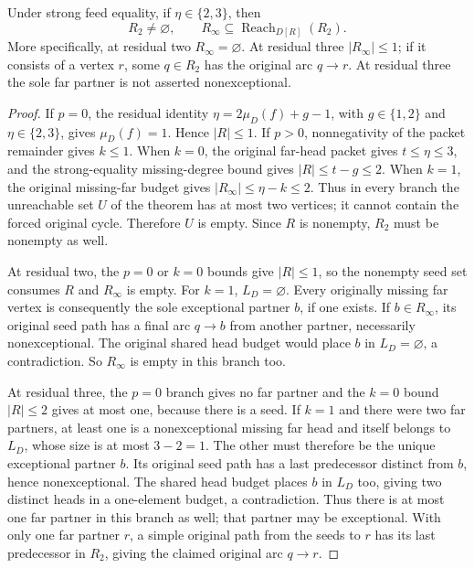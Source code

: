 \begin{corollary}
\label{cor:weak-equality-low-residual-seed}
Under strong feed equality, if $\eta\in\{2,3\}$, then
\[
 R_2\ne\varnothing,
 \qquad R_\infty\subseteq\operatorname{Reach}_{D[R]}(R_2).
\]
More specifically, at residual two $R_\infty=\varnothing$.
At residual three $|R_\infty|\le1$; if it consists of a vertex $r$,
some $q\in R_2$ has the original arc $q\to r$.
At residual three the sole far partner is not asserted nonexceptional.
\end{corollary}
\begin{proof}
If $p=0$, the residual identity
$\eta=2\mu_D(f)+g-1$, with $g\in\{1,2\}$ and
$\eta\in\{2,3\}$, gives $\mu_D(f)=1$. Hence $|R|\le1$.
If $p>0$, nonnegativity of the packet remainder gives $k\le1$.
When $k=0$, the original far-head packet gives $t\le\eta\le3$,
and the strong-equality missing-degree bound gives
$|R|\le t-g\le2$. When $k=1$, the original missing-far budget gives
$|R_\infty|\le\eta-k\le2$. Thus in every branch the unreachable
set $U$ of the theorem has at most two vertices; it cannot contain
the forced original cycle. Therefore $U$ is empty. Since $R$ is
nonempty, $R_2$ must be nonempty as well.

At residual two, the $p=0$ or $k=0$ bounds give $|R|\le1$,
so the nonempty seed set consumes $R$ and $R_\infty$ is empty.
For $k=1$, $L_D=\varnothing$. Every originally missing far vertex
is consequently the sole exceptional partner $b$, if one exists.
If $b\in R_\infty$, its original seed path has a final arc
$q\to b$ from another partner, necessarily nonexceptional.
The original shared head budget would place $b$ in
$L_D=\varnothing$, a contradiction.
So $R_\infty$ is empty in this branch too.

At residual three, the $p=0$ branch gives no far partner and the
$k=0$ bound $|R|\le2$ gives at most one, because there is a seed.
If $k=1$ and there were two far partners, at least one is a
nonexceptional missing far head and itself belongs to $L_D$, whose
size is at most $3-2=1$. The other must therefore be the unique
exceptional partner $b$. Its original seed path has a last predecessor
distinct from $b$, hence nonexceptional. The shared head budget places
$b$ in $L_D$ too, giving two distinct heads in a one-element budget,
a contradiction. Thus there is at most one far partner in this branch
as well; that partner may be exceptional. With only one far partner $r$, a
simple original path from the seeds to $r$ has its last predecessor
in $R_2$, giving the claimed original arc $q\to r$.
\end{proof}

